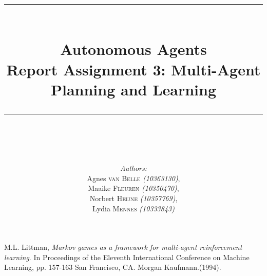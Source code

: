 \documentclass{article}
\newcommand{\HRule}{\rule{\linewidth}{0.1mm}}
\begin{document}
\title{ \HRule \\[0.2cm]
		Autonomous Agents\\ 
		Report Assignment 3: Multi-Agent Planning and Learning\\
		\HRule \\[0.1cm]
		}
		
\author{
		\emph{Authors:}\\[0.2cm]
		Agnes \textsc{van Belle} \small{ \emph{(10363130)}},\\ 
		Maaike \textsc{Fleuren} \small{ \emph{(10350470)}}, \\
		Norbert \textsc{Heijne} \small{ \emph{(10357769)}}, \\
		Lydia \textsc{Mennes} \small{ \emph{(10333843)}}
		}
		
\maketitle









\newpage
\nocite{*}


\begin{thebibliography}{9}
  M.L. Littman,
  \emph{Markov games as a framework for multi-agent reinforcement learning}. In Proceedings of the Eleventh International Conference on Machine Learning, pp. 157-163 San Francisco, CA. Morgan Kaufmann.(1994).
\end{thebibliography}
\end{document}
